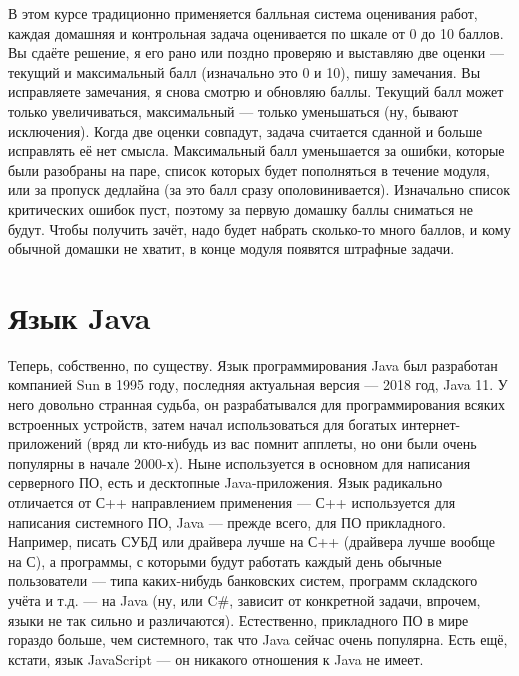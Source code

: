 \documentclass[a5paper]{article}
\begin{document}
В этом курсе традиционно применяется балльная система оценивания работ, каждая домашняя и контрольная задача оценивается по шкале от 0 до 10 баллов. Вы сдаёте решение, я его рано или поздно проверяю и выставляю две оценки --- текущий и максимальный балл (изначально это 0 и 10), пишу замечания. Вы исправляете замечания, я снова смотрю и обновляю баллы. Текущий балл может только увеличиваться, максимальный --- только уменьшаться (ну, бывают исключения). Когда две оценки совпадут, задача считается сданной и больше исправлять её нет смысла. Максимальный балл уменьшается за ошибки, которые были разобраны на паре, список которых будет пополняться в течение модуля, или за пропуск дедлайна (за это балл сразу ополовинивается). Изначально список критических ошибок пуст, поэтому за первую домашку баллы сниматься не будут. Чтобы получить зачёт, надо будет набрать сколько-то много баллов, и кому обычной домашки не хватит, в конце модуля появятся штрафные задачи.

\section{Язык Java}

Теперь, собственно, по существу. Язык программирования Java был разработан компанией Sun в 1995 году, последняя актуальная версия --- 2018 год, Java 11. У него довольно странная судьба, он разрабатывался для программирования всяких встроенных устройств, затем начал использоваться для богатых интернет-приложений (вряд ли кто-нибудь из вас помнит апплеты, но они были очень популярны в начале 2000-х). Ныне используется в основном для написания серверного ПО, есть и десктопные Java-приложения. Язык радикально отличается от С++ направлением применения --- С++ используется для написания системного ПО, Java --- прежде всего, для ПО прикладного. Например, писать СУБД или драйвера лучше на С++ (драйвера лучше вообще на С), а программы, с которыми будут работать каждый день обычные пользователи --- типа каких-нибудь банковских систем, программ складского учёта и т.д. --- на Java (ну, или C\#, зависит от конкретной задачи, впрочем, языки не так сильно и различаются). Естественно, прикладного ПО в мире гораздо больше, чем системного, так что Java сейчас очень популярна. Есть ещё, кстати, язык JavaScript --- он никакого отношения к Java не имеет.
\end{document}
